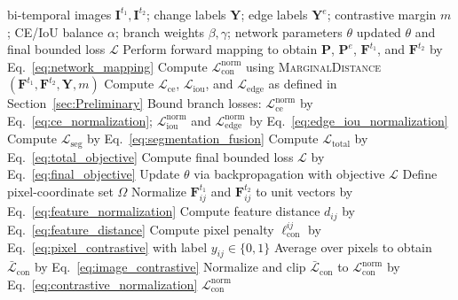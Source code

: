 \begin{algorithm}[t]
    \caption{Annotation-Consistent Bounded Multi-Task Optimization}
    \label{alg:proposed}
    \begin{algorithmic}[1]
        \Require bi-temporal images $\mathbf{I}^{t_1},\mathbf{I}^{t_2}$; change labels $\mathbf{Y}$; edge labels $\mathbf{Y}^{e}$; contrastive margin $m$; CE/IoU balance $\alpha$; branch weights $\beta,\gamma$; network parameters $\theta$
        \Ensure updated $\theta$ and final bounded loss $\mathcal{L}$
        \State Perform forward mapping to obtain $\mathbf{P}$, $\mathbf{P}^{e}$, $\mathbf{F}^{t_1}$, and $\mathbf{F}^{t_2}$ by Eq.~\eqref{eq:network_mapping}
        \State Compute $\mathcal{L}_{\text{con}}^{\text{norm}}$ using \textsc{MarginalDistance}$(\mathbf{F}^{t_1},\mathbf{F}^{t_2},\mathbf{Y},m)$
        \State Compute $\mathcal{L}_{\text{ce}}$, $\mathcal{L}_{\text{iou}}$, and $\mathcal{L}_{\text{edge}}$ as defined in Section~\ref{sec:Preliminary}
        \State Bound branch losses: $\mathcal{L}_{\text{ce}}^{\text{norm}}$ by Eq.~\eqref{eq:ce_normalization}; $\mathcal{L}_{\text{iou}}^{\text{norm}}$ and $\mathcal{L}_{\text{edge}}^{\text{norm}}$ by Eq.~\eqref{eq:edge_iou_normalization}
        \State Compute $\mathcal{L}_{\text{seg}}$ by Eq.~\eqref{eq:segmentation_fusion}
        \State Compute $\mathcal{L}_{\text{total}}$ by Eq.~\eqref{eq:total_objective}
        \State Compute final bounded loss $\mathcal{L}$ by Eq.~\eqref{eq:final_objective}
        \State Update $\theta$ via backpropagation with objective $\mathcal{L}$
        \Statex
            \State Define pixel-coordinate set $\Omega$
                \State Normalize $\mathbf{F}^{t_1}_{ij}$ and $\mathbf{F}^{t_2}_{ij}$ to unit vectors by Eq.~\eqref{eq:feature_normalization}
                \State Compute feature distance $d_{ij}$ by Eq.~\eqref{eq:feature_distance}
                \State Compute pixel penalty $\ell_{\text{con}}^{ij}$ by Eq.~\eqref{eq:pixel_contrastive} with label $y_{ij}\in\{0,1\}$
            \EndFor
            \State Average over pixels to obtain $\bar{\mathcal{L}}_{\text{con}}$ by Eq.~\eqref{eq:image_contrastive}
            \State Normalize and clip $\bar{\mathcal{L}}_{\text{con}}$ to $\mathcal{L}_{\text{con}}^{\text{norm}}$ by Eq.~\eqref{eq:contrastive_normalization}
            \State \Return $\mathcal{L}_{\text{con}}^{\text{norm}}$
        \EndProcedure
    \end{algorithmic}
\end{algorithm}
